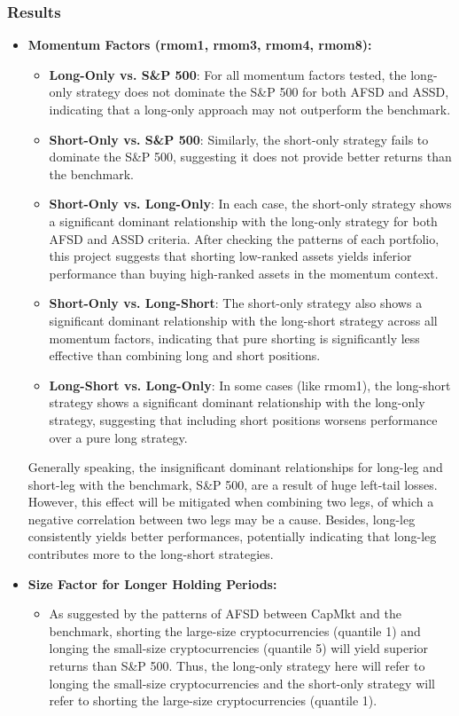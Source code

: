 \documentclass{article}
\begin{document}
\subsubsection{Results}
\begin{itemize}
    \item \textbf{Momentum Factors (rmom1, rmom3, rmom4, rmom8):}
    \begin{itemize}
        \item \textbf{Long-Only vs. S\&P 500}: For all momentum factors tested, the long-only strategy does not dominate the S\&P 500 for both AFSD and ASSD, indicating that a long-only approach may not outperform the benchmark.
        \item \textbf{Short-Only vs. S\&P 500}: Similarly, the short-only strategy fails to dominate the S\&P 500, suggesting it does not provide better returns than the benchmark.
        \item \textbf{Short-Only vs. Long-Only}: In each case, the short-only strategy shows a significant dominant relationship with the long-only strategy for both AFSD and ASSD criteria. After checking the patterns of each portfolio, this project suggests that shorting low-ranked assets yields inferior performance than buying high-ranked assets in the momentum context.
        \item \textbf{Short-Only vs. Long-Short}: The short-only strategy also shows a significant dominant relationship with the long-short strategy across all momentum factors, indicating that pure shorting is significantly less effective than combining long and short positions.
        \item \textbf{Long-Short vs. Long-Only}: In some cases (like rmom1), the long-short strategy shows a significant dominant relationship with the long-only strategy, suggesting that including short positions worsens performance over a pure long strategy.
    \end{itemize}
     Generally speaking, the insignificant dominant relationships for long-leg and short-leg with the benchmark, S\&P 500, are a result of huge left-tail losses. However, this effect will be mitigated when combining two legs, of which a negative correlation between two legs may be a cause. Besides, long-leg consistently yields better performances, potentially indicating that long-leg contributes more to the long-short strategies.
    \item \textbf{Size Factor for Longer Holding Periods:}
    \begin{itemize}
        \item As suggested by the patterns of AFSD between CapMkt and the benchmark, shorting the large-size cryptocurrencies (quantile 1) and longing the small-size cryptocurrencies (quantile 5) will yield superior returns than S\&P 500. Thus, the long-only strategy here will refer to longing the small-size cryptocurrencies and the short-only strategy will refer to shorting the large-size cryptocurrencies (quantile 1).

\end{itemize}
\end{itemize}
\end{document}
